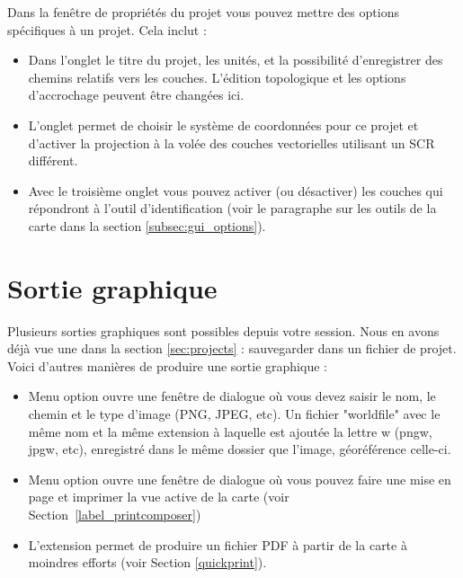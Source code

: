 Dans la fenêtre de propriétés du projet vous pouvez mettre des options spécifiques à un projet. Cela inclut :
\begin{itemize}[label=--]
 \item Dans l'onglet  le titre du projet, les unités, et la possibilité d'enregistrer des chemins relatifs vers les couches. L'édition topologique et les options d'accrochage peuvent être changées ici.
\item L'onglet  permet de choisir le système de coordonnées pour ce projet et d'activer la projection à la volée des couches vectorielles utilisant un SCR différent.
\item Avec le troisième onglet  vous pouvez activer (ou désactiver) les couches qui répondront à l'outil d'identification (voir le paragraphe sur les outils de la carte dans la section \ref{subsec:gui_options}).
\end{itemize}

\section{Sortie graphique} \label{sec:output}

Plusieurs sorties graphiques sont possibles depuis votre session. Nous en avons déjà vue une dans la section \ref{sec:projects} : sauvegarder dans un fichier de projet.
Voici d'autres manières de produire une sortie graphique :
\begin{itemize}[label=--]
\item Menu option  ouvre une fenêtre de dialogue où vous devez saisir le nom, le chemin et le type d'image (PNG, JPEG, etc). Un fichier "worldfile" avec le même nom et la même extension à laquelle est ajoutée la lettre w (pngw, jpgw, etc), enregistré dans le même dossier que l'image, géoréférence celle-ci.
\item Menu option  ouvre une fenêtre de dialogue où vous pouvez faire une mise en page et imprimer la vue active de la carte (voir Section~\ref{label_printcomposer})
\item L'extension  permet de produire un fichier PDF à partir de la carte à moindres efforts (voir Section \ref{quickprint}).
\end{itemize}

